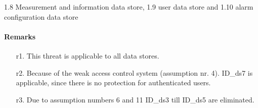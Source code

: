 1.8 Measurement and information data store, 1.9 user data store and 1.10 alarm
configuration data store

\paragraph{Remarks}
	\begin{enumerate}
         \item[r1.] This threat is applicable to all data stores.
         \item[r2.] Because of the weak access control system (assumption nr.
         4). ID\_ds7 is applicable, since there is no protection for
         authenticated users.
         \item[r3.] Due to assumption numbers 6 and 11 ID\_ds3 till ID\_ds5 are
         eliminated.
    \end{enumerate}
